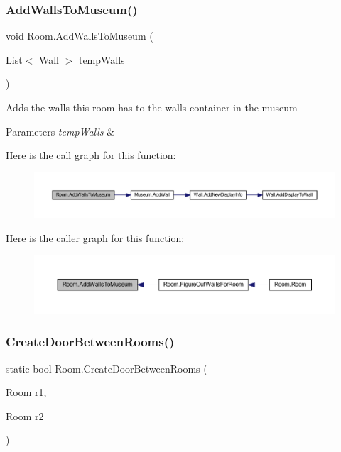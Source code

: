 \subsubsection{\texorpdfstring{Add\+Walls\+To\+Museum()}{AddWallsToMuseum()}}
{\footnotesize\ttfamily void Room.\+Add\+Walls\+To\+Museum (\begin{DoxyParamCaption}\item[{List$<$ \mbox{\hyperlink{class_wall}{Wall}} $>$}]{temp\+Walls }\end{DoxyParamCaption})\hspace{0.3cm}{\ttfamily [private]}}



Adds the walls this room has to the walls container in the museum 


\begin{DoxyParams}{Parameters}
{\em temp\+Walls} & \\
\hline
\end{DoxyParams}
Here is the call graph for this function\+:
\nopagebreak
\begin{figure}[H]
\begin{center}
\leavevmode
\includegraphics[width=350pt]{class_room_a710be7ee50b4dd0abb526e344543a513_cgraph}
\end{center}
\end{figure}
Here is the caller graph for this function\+:
\nopagebreak
\begin{figure}[H]
\begin{center}
\leavevmode
\includegraphics[width=350pt]{class_room_a710be7ee50b4dd0abb526e344543a513_icgraph}
\end{center}
\end{figure}
\mbox{\label{class_room_a294bb89a25ac765eca25106ccb4d1955}} 
\subsubsection{\texorpdfstring{Create\+Door\+Between\+Rooms()}{CreateDoorBetweenRooms()}}
{\footnotesize\ttfamily static bool Room.\+Create\+Door\+Between\+Rooms (\begin{DoxyParamCaption}\item[{\mbox{\hyperlink{class_room}{Room}}}]{r1,  }\item[{\mbox{\hyperlink{class_room}{Room}}}]{r2 }\end{DoxyParamCaption})\hspace{0.3cm}{\ttfamily [static]}}



